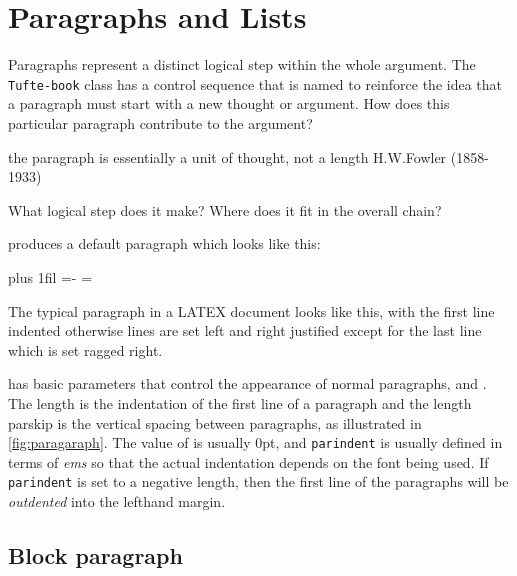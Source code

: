 \chapter{Paragraphs and Lists}


Paragraphs represent a distinct logical step within the whole argument. The \texttt{Tufte-book} class has a control sequence that is named \texttt{\string\newthought} to reinforce the idea that a paragraph must start with a new thought or argument. How does this particular paragraph contribute to the argument? 

the paragraph is essentially a unit of thought, not a length
H.W.Fowler (1858-1933)

What logical step does it make? Where does it fit in the overall chain?



\LaTeXe produces a default paragraph which looks like this:
\medskip
\newcommand*{\justlastragged}{%
\leftskip=0pt plus 1fil
\rightskip=-\leftskip
\parfillskip=\leftskip
\parindent=0pt}


{\justlastragged\par 
The typical paragraph in a LATEX document
looks like this, with the first line indented otherwise
 lines are set left and right justified except for
the last line which is set ragged right.}


\begin{macro}{\parindent}
\begin{macro}{\parskip}
\begin{macro}{\noindent}
\LaTeXe has basic parameters that control the appearance of normal paragraphs,
 and  .
The length   is the indentation of the first line of a paragraph and the length
parskip is the vertical spacing between paragraphs, as illustrated in \ref{fig:paragaraph}. The
value of  is usually 0pt, and \texttt{parindent} is usually defined in terms of \textit{ems}
so that the actual indentation depends on the font being used. If \texttt{parindent} is set to a
negative length, then the first line of the paragraphs will be \textit{outdented} into the lefthand
margin.
\end{macro}
\end{macro}
\end{macro}



\section{Block paragraph}

